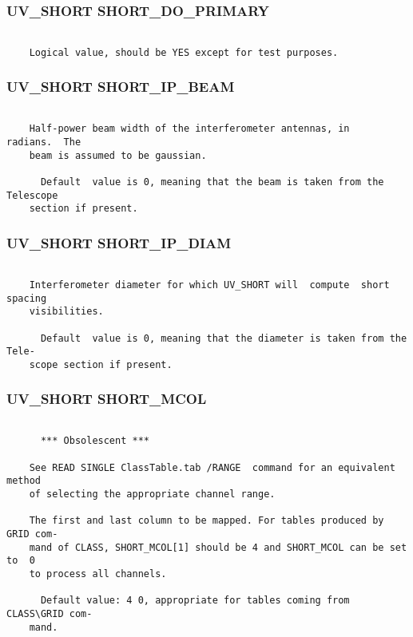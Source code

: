 \subsubsection{UV\_SHORT SHORT\_DO\_PRIMARY}
\begin{verbatim}

    Logical value, should be YES except for test purposes.

\end{verbatim}
\subsubsection{UV\_SHORT SHORT\_IP\_BEAM}
\begin{verbatim}

    Half-power beam width of the interferometer antennas, in   radians.  The
    beam is assumed to be gaussian.

      Default  value is 0, meaning that the beam is taken from the Telescope
    section if present.

\end{verbatim}
\subsubsection{UV\_SHORT SHORT\_IP\_DIAM}
\begin{verbatim}

    Interferometer diameter for which UV_SHORT will  compute  short  spacing
    visibilities.

      Default  value is 0, meaning that the diameter is taken from the Tele-
    scope section if present.

\end{verbatim}
\subsubsection{UV\_SHORT SHORT\_MCOL}
\begin{verbatim}

      *** Obsolescent ***

    See READ SINGLE ClassTable.tab /RANGE  command for an equivalent  method
    of selecting the appropriate channel range.

    The first and last column to be mapped. For tables produced by GRID com-
    mand of CLASS, SHORT_MCOL[1] should be 4 and SHORT_MCOL can be set to  0
    to process all channels.

      Default value: 4 0, appropriate for tables coming from CLASS\GRID com-
    mand.


\end{verbatim}
